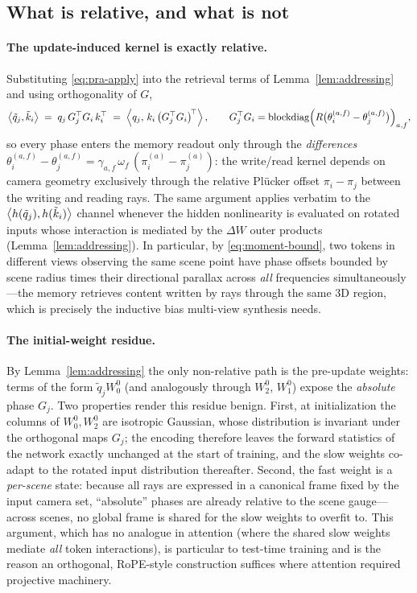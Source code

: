\subsection{What is relative, and what is not}
\label{sec:method-analysis}

\paragraph{The update-induced kernel is exactly relative.}
Substituting \eqref{eq:pra-apply} into the retrieval terms of
Lemma~\ref{lem:addressing} and using orthogonality of $G$,
\begin{equation}
\label{eq:relative-kernel}
\left\langle \tilde q_j, \tilde k_i \right\rangle
\;=\;
q_j\, G_j^\top G_i\, k_i^\top
\;=\;
\left\langle q_j, \,k_i\,\big(G_j^\top G_i\big)^{\!\top} \right\rangle
,
\qquad
G_j^\top G_i
=
\mathrm{blockdiag}\Big( R\big(\theta_i^{(a,f)} - \theta_j^{(a,f)}\big) \Big)_{a,f},
\end{equation}
so every phase enters the memory readout only through the
\emph{differences} $\theta_i^{(a,f)} - \theta_j^{(a,f)} =
\gamma_{a,f}\,\omega_f\,(\pi_i^{(a)} - \pi_j^{(a)})$: the write/read kernel
depends on camera geometry exclusively through the relative Plücker offset
$\pi_i - \pi_j$ between the writing and reading rays. The same argument
applies verbatim to the $\left\langle h(\tilde q_j), h(\tilde k_i) \right\rangle$ channel
whenever the hidden nonlinearity is evaluated on rotated inputs whose
interaction is mediated by the $\Delta W$ outer products
(Lemma~\ref{lem:addressing}). In particular, by
\eqref{eq:moment-bound}, two tokens in different views observing the same
scene point have phase offsets bounded by scene radius times their
directional parallax across \emph{all} frequencies simultaneously---the
memory retrieves content written by rays through the same 3D region, which
is precisely the inductive bias multi-view synthesis needs.

\paragraph{The initial-weight residue.}
By Lemma~\ref{lem:addressing} the only non-relative path is the pre-update
weights: terms of the form $\tilde q_j W_0^0$ (and analogously through
$W_2^0$, $W_1^0$) expose the \emph{absolute} phase $G_j$. Two properties
render this residue benign. First, at initialization the columns of
$W_0^0, W_2^0$ are isotropic Gaussian, whose distribution is invariant under
the orthogonal maps $G_j$; the encoding therefore leaves the forward
statistics of the network exactly unchanged at the start of training, and
the slow weights co-adapt to the rotated input distribution thereafter.
Second, the fast weight is a \emph{per-scene} state: because all rays are
expressed in a canonical frame fixed by the input camera set, ``absolute''
phases are already relative to the scene gauge---across scenes, no global
frame is shared for the slow weights to overfit to. This argument, which
has no analogue in attention (where the shared slow weights mediate
\emph{all} token interactions), is particular to test-time training and is
the reason an orthogonal, RoPE-style construction suffices where attention
required projective machinery.

